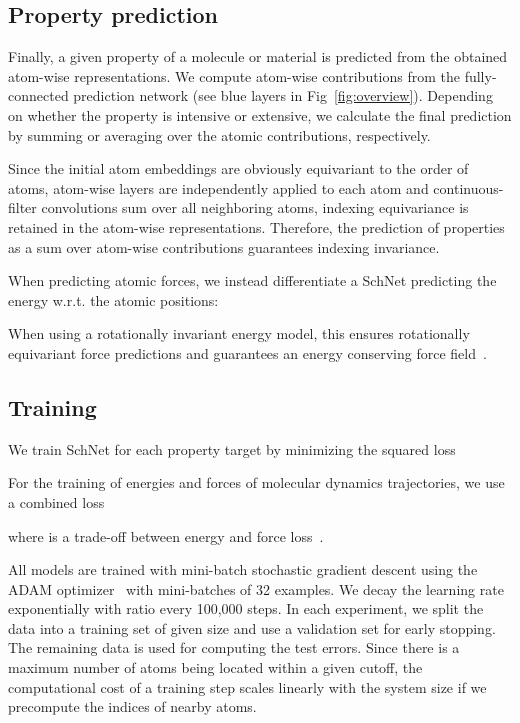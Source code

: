 \documentclass[aip,jcp,reprint,graphicx]{revtex4-1}
\newcommand{\new}[1]{#1}
\begin{document}
\subsection{Property prediction}
Finally, a given property  of a molecule or material is predicted from the obtained atom-wise representations.
We compute atom-wise contributions  from the fully-connected prediction network (see blue layers in Fig~\ref{fig:overview}).
Depending on whether the property is intensive or extensive, we calculate the final prediction  by summing or averaging over the atomic contributions, respectively.

\new{Since the initial atom embeddings are obviously equivariant to the order of atoms, atom-wise layers are independently applied to each atom and continuous-filter convolutions sum over all neighboring atoms, indexing equivariance is retained in the atom-wise representations.
Therefore, the prediction of properties as a sum over atom-wise contributions guarantees indexing invariance.}

When predicting atomic forces, we instead differentiate a SchNet predicting the energy w.r.t. the atomic positions:

When using a rotationally invariant energy model, this ensures rotationally equivariant force predictions and guarantees an energy conserving force field~\cite{chmiela2017machine}.

\subsection{Training}
We train SchNet for each property target  by minimizing the squared loss

For the training of energies and forces of molecular dynamics trajectories, we use a combined loss

where  is a trade-off between energy and force loss~\citep{pukrittayakamee2009simultaneous}.

All models are trained with mini-batch stochastic gradient descent using the ADAM optimizer~\citep{KingmaB14} with mini-batches of 32 examples.
We decay the learning rate exponentially with ratio  every 100,000 steps.
In each experiment, we split the data into a training set of given size  and use a validation set for early stopping. The remaining data is used for computing the test errors.
Since there is a maximum number of atoms being located within a given cutoff, the computational cost of a training step scales linearly with the system size if we precompute the indices of nearby atoms.
\end{document}
